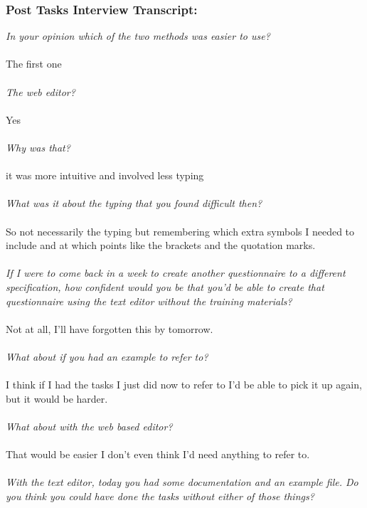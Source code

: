\documentclass{report}
\begin{document}
\subsubsection*{Post Tasks Interview Transcript:}
\textit{In your opinion which of the two methods was easier to use?}
\\
\\
The first one
\\
\\
\textit{The web editor?}
\\
\\
Yes
\\
\\
\textit{Why was that?}
\\
\\
it was more intuitive and involved less typing
\\
\\
\textit{What was it about the typing that you found difficult then?}
\\
\\
So not necessarily the typing but remembering which extra symbols I needed to include and at which points like the brackets and the quotation marks.
\\
\\
\textit{If I were to come back in a week to create another questionnaire to a different specification, how confident would you be that you'd be able to create that questionnaire using the text editor without the training materials?}
\\
\\
Not at all, I'll have forgotten this by tomorrow.
\\
\\
\textit{What about if you had an example to refer to?}
\\
\\
I think if I had the tasks I just did now to refer to I'd be able to pick it up again, but it would be harder.
\\
\\
\textit{What about with the web based editor?}
\\
\\
That would be easier I don't even think I'd need anything to refer to.
\\
\\
\textit{With the text editor, today you had some documentation and an example file. Do you think you could have done the tasks without either of those things?}
\\
\\
\end{document}
